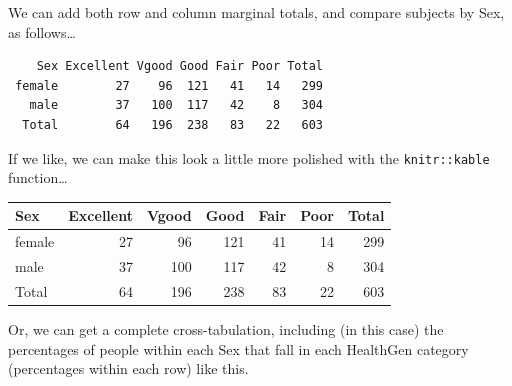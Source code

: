 \documentclass[
]{book}
\newenvironment{Shaded}{\begin{snugshade}}{\end{snugshade}}
\newcommand{\KeywordTok}[1]{\textcolor[rgb]{0.13,0.29,0.53}{\textbf{#1}}}
\newcommand{\NormalTok}[1]{#1}
\newcommand{\OperatorTok}[1]{\textcolor[rgb]{0.81,0.36,0.00}{\textbf{#1}}}
\newcommand{\StringTok}[1]{\textcolor[rgb]{0.31,0.60,0.02}{#1}}
\begin{document}
We can add both row and column marginal totals, and compare subjects by Sex, as follows\ldots{}

\begin{Shaded}
\end{Shaded}

\begin{verbatim}
    Sex Excellent Vgood Good Fair Poor Total
 female        27    96  121   41   14   299
   male        37   100  117   42    8   304
  Total        64   196  238   83   22   603
\end{verbatim}

If we like, we can make this look a little more polished with the \texttt{knitr::kable} function\ldots{}

\begin{Shaded}
\end{Shaded}

\begin{tabular}{l|r|r|r|r|r|r}
\hline
Sex & Excellent & Vgood & Good & Fair & Poor & Total\\
\hline
female & 27 & 96 & 121 & 41 & 14 & 299\\
\hline
male & 37 & 100 & 117 & 42 & 8 & 304\\
\hline
Total & 64 & 196 & 238 & 83 & 22 & 603\\
\hline
\end{tabular}

Or, we can get a complete cross-tabulation, including (in this case) the percentages of people within each Sex that fall in each HealthGen category (percentages within each row) like this.

\begin{Shaded}
\end{Shaded}
\end{document}
